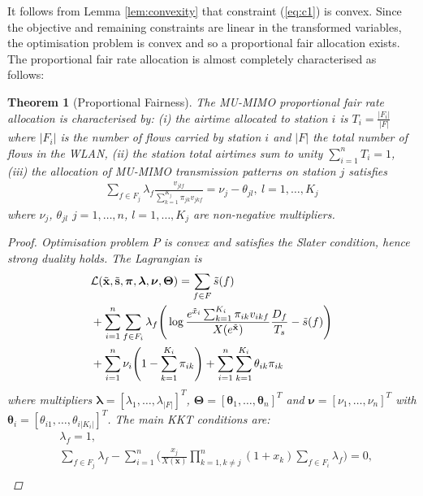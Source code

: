 \documentclass[11pt]{amsart}
\def\m#1{\mathbf{#1}}
\newtheorem{theorem}{Theorem}
\begin{document}
It follows from Lemma \ref{lem:convexity} that constraint (\ref{eq:c1}) is convex.   Since the objective and remaining constraints are linear in the transformed variables, the optimisation problem is convex and so a proportional fair allocation exists.    The proportional fair rate allocation is almost completely characterised as follows: 
\begin{theorem}[Proportional Fairness]\label{lem:kkt}
The MU-MIMO proportional fair rate allocation is characterised by: (i) the airtime allocated to station $i$ is $T_i= \frac{ |F_i|}{ |F|}$ where $|F_i|$ is the number of flows carried by station $i$ and $|F|$ the total number of flows in the WLAN, (ii)  the station total airtimes sum to unity $\sum_{i=1}^n T_i=1$, (iii) the allocation of MU-MIMO transmission patterns on station $j$ satisfies 
\begin{align}
\sum_{f \in F_j} \lambda_f \frac{v_{jlf} }{\sum_{k=1}^{K_j} \pi_{jk} v_{jkf}} =  \nu_j - \theta_{jl},\ l=1,\dots,K_j \label{eq:3kkt}
\end{align}
where $\nu_j$, $\theta_{jl}$ $j=1,\dots,n$, $l=1,\dots,K_j$ are non-negative multipliers.
\begin{proof}
Optimisation problem $P$ is convex and satisfies the Slater condition, hence strong duality holds. The Lagrangian is 
\small
\begin{align*}
&\mathcal{L}(\tilde{\m{x}},\tilde{\m{s}}, \boldsymbol \pi , \boldsymbol \lambda, \boldsymbol \nu, \boldsymbol \Theta) =  \sum_{f \in F} {\tilde{s}(f)} \\
&+ \sum_{i=1}^n \sum_{f \in F_i} {\lambda_f} \Bigg ( \log \frac{e^{\tilde{x}_i} \sum_{k=1}^{K_i} \pi_{ik} v_{ikf} }{X(e^{\tilde{\m{x}}})}\frac{D_f}{T_s}  - \tilde{s}(f) \Bigg )\\ 
&+ \sum_{i=1}^n \nu_i \Bigg ( 1- \sum_{k=1}^{K_i} \pi_{ik}  \Bigg )  + \sum_{i=1}^n \sum_{k=1}^{K_i} \theta_{ik} \pi_{ik} \notag
\end{align*}
\normalsize
where multipliers $\boldsymbol {\lambda} = [\lambda_{1},\dots,\lambda_{|F|}]^T$, $\boldsymbol {\Theta}= [\boldsymbol \theta_{1},\dots,\boldsymbol \theta_n]^T$ and $\boldsymbol \nu = [\nu_1,\dots,\nu_n]^T$ with $\boldsymbol \theta_i=[\theta_{i1},\dots,\theta_{i|K_i|}]^T$.  
The main KKT conditions are: 
\small
\begin{align}
&\lambda_f = 1 \label{eq:fkkt1},\\
&\sum_{f \in F_j} \lambda_f - \sum_{i=1}^n \Bigg (\frac{x_j}{X(\m{x})}  \prod_{k=1,k \ne j}^{n} (1+x_k) \sum_{f \in F_i} \lambda_f \Bigg )= 0 \label{eq:fkkt2}, \\

\end{align}
\end{proof}
\end{theorem}
\end{document}
